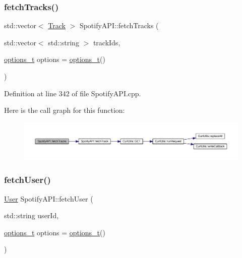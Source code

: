 \subsubsection{\texorpdfstring{fetch\+Tracks()}{fetchTracks()}}
{\footnotesize\ttfamily std\+::vector$<$ \mbox{\hyperlink{class_track}{Track}} $>$ Spotify\+A\+P\+I\+::fetch\+Tracks (\begin{DoxyParamCaption}\item[{std\+::vector$<$ std\+::string $>$}]{track\+Ids,  }\item[{\mbox{\hyperlink{_spotify_a_p_i_8h_a0ff5cac1a4007bb330b7d9939650c283}{options\+\_\+t}}}]{options = {\ttfamily \mbox{\hyperlink{_spotify_a_p_i_8h_a0ff5cac1a4007bb330b7d9939650c283}{options\+\_\+t}}()} }\end{DoxyParamCaption})}



Definition at line 342 of file Spotify\+A\+P\+I.\+cpp.

Here is the call graph for this function\+:
\nopagebreak
\begin{figure}[H]
\begin{center}
\leavevmode
\includegraphics[width=350pt]{class_spotify_a_p_i_aa075dad1790b6cdc0cbd29648b65bfef_cgraph}
\end{center}
\end{figure}
\mbox{\label{class_spotify_a_p_i_aac12cdeda01f0a32a4faedf659ba178d}} 
\subsubsection{\texorpdfstring{fetch\+User()}{fetchUser()}}
{\footnotesize\ttfamily \mbox{\hyperlink{class_user}{User}} Spotify\+A\+P\+I\+::fetch\+User (\begin{DoxyParamCaption}\item[{std\+::string}]{user\+Id,  }\item[{\mbox{\hyperlink{_spotify_a_p_i_8h_a0ff5cac1a4007bb330b7d9939650c283}{options\+\_\+t}}}]{options = {\ttfamily \mbox{\hyperlink{_spotify_a_p_i_8h_a0ff5cac1a4007bb330b7d9939650c283}{options\+\_\+t}}()} }\end{DoxyParamCaption})}



